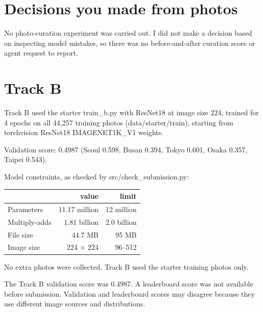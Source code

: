 \documentclass[11pt]{article}
\begin{document}
\section*{Decisions you made from photos}


No photo-curation experiment was carried out. I did not make a decision based on inspecting model mistakes, so there was no before-and-after curation score or agent request to report.

\section*{Track B}

Track B used the starter train\_b.py with ResNet18 at image size 224,
trained for 4 epochs on all 44{,}257 training photos
(data/starter/train), starting from torchvision ResNet18 IMAGENET1K\_V1
weights.

Validation score: 0.4987 (Seoul 0.598, Busan 0.394, Tokyo 0.601, Osaka
0.357, Taipei 0.543).

Model constraints, as checked by src/check\_submission.py:
\begin{center}\footnotesize
\begin{tabular}{lrr}
\toprule
 & value & limit \\
\midrule
Parameters & 11.17 million & 12 million \\
Multiply-adds & 1.81 billion & 2.0 billion \\
File size & 44.7 MB & 95 MB \\
Image size & 224 $\times$ 224 & 96--512 \\
\bottomrule
\end{tabular}
\end{center}


No extra photos were collected. Track B used the starter training photos only.

The Track B validation score was 0.4987. A leaderboard score was not available before submission. Validation and leaderboard scores may disagree because they use different image sources and distributions.

\end{document}
